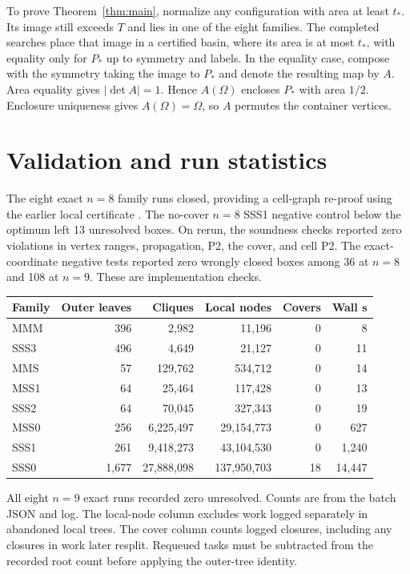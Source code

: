 \documentclass[11pt]{amsart}
\newcommand{\Om}{\Omega}
\begin{document}
To prove Theorem~\ref{thm:main}, normalize any configuration with area at least \(t_*\). Its image still exceeds \(T\) and lies in one of the eight families. The completed searches place that image in a certified basin, where its area is at most \(t_*\), with equality only for \(P_*\) up to symmetry and labels. In the equality case, compose with the symmetry taking the image to \(P_*\) and denote the resulting map by \(A\). Area equality gives \(|\det A|=1\). Hence \(A(\Om)\) encloses \(P_*\) with area \(1/2\). Enclosure uniqueness gives \(A(\Om)=\Om\), so \(A\) permutes the container vertices.

\section{Validation and run statistics}
The eight exact \(n=8\) family runs closed, providing a cell-graph re-proof using the earlier local certificate \cite{Tri8}. The no-cover \(n=8\) SSS1 negative control below the optimum left 13 unresolved boxes. On rerun, the soundness checks reported zero violations in vertex ranges, propagation, P2, the cover, and cell P2. The exact-coordinate negative tests reported zero wrongly closed boxes among 36 at \(n=8\) and 108 at \(n=9\). These are implementation checks.

\begin{center}
\small
\begin{tabular}{lrrrrr}
\toprule
Family & Outer leaves & Cliques & Local nodes & Covers & Wall s\\
\midrule
MMM &396&2,982&11,196&0&8\\
SSS3 &496&4,649&21,127&0&11\\
MMS &57&129,762&534,712&0&14\\
MSS1 &64&25,464&117,428&0&13\\
SSS2 &64&70,045&327,343&0&19\\
MSS0 &256&6,225,497&29,154,773&0&627\\
SSS1 &261&9,418,273&43,104,530&0&1,240\\
SSS0 &1,677&27,888,098&137,950,703&18&14,447\\
\bottomrule
\end{tabular}
\end{center}
All eight \(n=9\) exact runs recorded zero unresolved. Counts are from the batch JSON and log. The local-node column excludes work logged separately in abandoned local trees. The cover column counts logged closures, including any closures in work later resplit. Requeued tasks must be subtracted from the recorded root count before applying the outer-tree identity.
\end{document}
